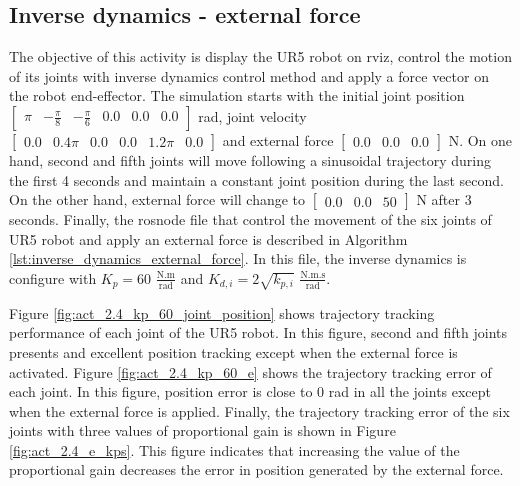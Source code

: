 \subsection{Inverse dynamics - external force}
The objective of this activity is display the UR5 robot on rviz, control the motion of its joints with inverse dynamics control method and apply a force vector on the robot end-effector. The simulation starts with the initial joint position $\begin{bmatrix} \pi & -\frac{\pi}{8} & -\frac{\pi}{6} & 0.0 & 0.0 & 0.0 \end{bmatrix}$ rad, joint velocity $\begin{bmatrix} 0.0 & 0.4\pi & 0.0 & 0.0 & 1.2\pi & 0.0 \end{bmatrix}$ and external force $\begin{bmatrix} 0.0 & 0.0 & 0.0 \end{bmatrix}$ N. On one hand, second and fifth joints will move following a sinusoidal trajectory during the first 4 seconds and maintain a constant joint position during the last second. On the other hand, external force will change to $\begin{bmatrix} 0.0 & 0.0 & 50 \end{bmatrix}$ N after $3$ seconds. Finally, the rosnode file that control the movement of the six joints of UR5 robot and apply an external force is described in Algorithm \ref{lst:inverse_dynamics_external_force}. In this file, the inverse dynamics is configure with $K_p=60$ $\mathrm{\frac{N.m}{rad}}$ and $K_{d,i}=2\sqrt{k_{p,i}}$ $\mathrm{\frac{N.m.s}{rad}}$.

Figure \ref{fig:act_2.4_kp_60_joint_position} shows trajectory tracking performance of each joint of the UR5 robot. In this figure, second and fifth joints presents and excellent position tracking except when the external force is activated. Figure   \ref{fig:act_2.4_kp_60_e} shows the trajectory tracking error of each joint. In this figure, position error is close to $0$ rad in all the joints except when the external force is applied. Finally, the trajectory tracking error of the six joints with three values of proportional gain is shown in Figure \ref{fig:act_2.4_e_kps}. This figure indicates that increasing the value of the proportional gain decreases the error in position generated by the external force. 

